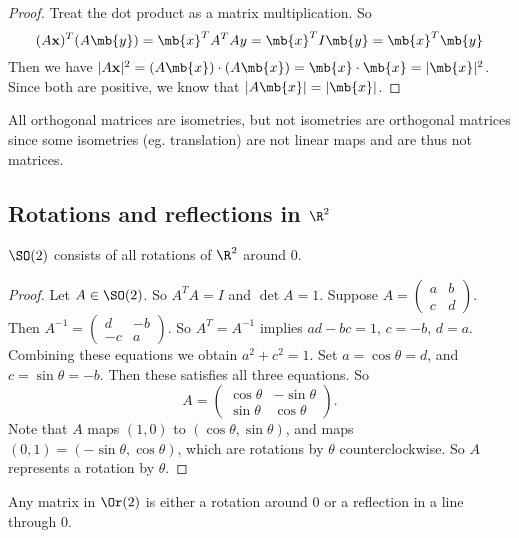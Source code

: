 \documentclass[a4paper]{article}
\begin{document}
\begin{proof}
  Treat the dot product as a matrix multiplication. So
  \[
    (A\mathbf{x})^T(A\mb{y}) = \mb{x}^{T}A^TAy = \mb{x}^TI\mb{y} = \mb{x}^T\mb{y}
  \]
  Then we have $|A\mathbf{x}|^2 = (A\mb{x})\cdot (A\mb{x}) = \mb{x}\cdot \mb{x} = |\mb{x}|^2$. Since both are positive, we know that $|A\mb{x}| = |\mb{x}|$.
\end{proof}
\note All orthogonal matrices are isometries, but not isometries are orthogonal matrices since some isometries (eg. translation) are not linear maps and are thus not matrices.
\subsection{Rotations and reflections in \texorpdfstring{$\R^2$}{R2}}
\begin{lemma}
  $\SO(2)$ consists of all rotations of $\R^2$ around 0.
\end{lemma}

\begin{proof}
  Let $A\in \SO(2)$. So $A^TA = I$ and $\det A = 1$. Suppose $A =
  \begin{pmatrix}
    a & b\\c & d
  \end{pmatrix}$. Then $A^{-1} =
  \begin{pmatrix}
    d & -b\\-c & a
  \end{pmatrix}.$ So $A^T = A^{-1}$ implies $ad - bc = 1$, $c = -b$, $d = a$. Combining these equations we obtain $a^2 + c^2 = 1$. Set $a = \cos\theta = d$, and $c = \sin\theta = -b$. Then these satisfies all three equations. So
  \[
    A =
    \begin{pmatrix}
      \cos\theta & -\sin\theta\\
      \sin\theta & \cos\theta
    \end{pmatrix}.
  \]
  Note that $A$ maps $(1, 0)$ to $(\cos\theta, \sin \theta)$, and maps $(0, 1)= (-\sin\theta, \cos\theta)$, which are rotations by $\theta$ counterclockwise. So $A$ represents a rotation by $\theta$.
\end{proof}

\begin{cor}
  Any matrix in $\Or(2)$ is either a rotation around $0$ or a reflection in a line through $0$.
\end{cor}
\end{document}
